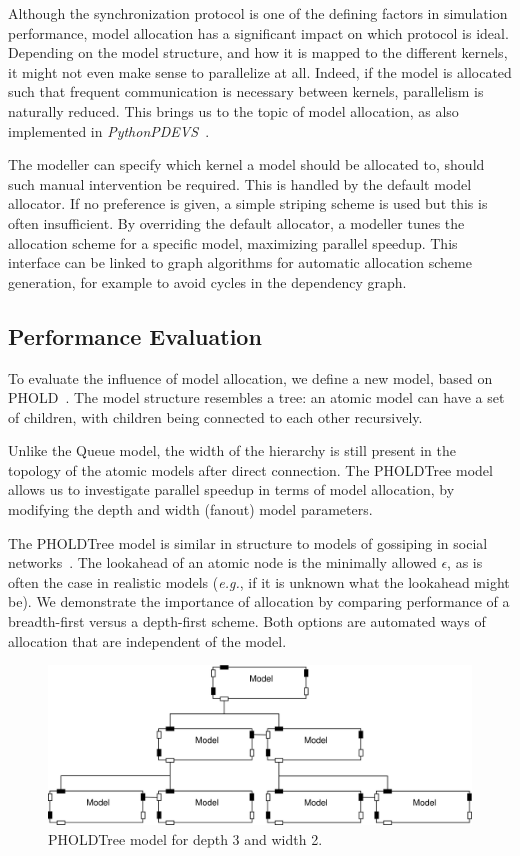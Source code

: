 Although the synchronization protocol is one of the defining factors in simulation performance, model allocation has a significant impact on which protocol is ideal.
Depending on the model structure, and how it is mapped to the different kernels, it might not even make sense to parallelize at all.
Indeed, if the model is allocated such that frequent communication is necessary between kernels, parallelism is naturally reduced.
This brings us to the topic of model allocation, as also implemented in \textit{PythonPDEVS}~\cite{PythonPDEVS2}.

The modeller can specify which kernel a model should be allocated to, should such manual intervention be required.
This is handled by the default model allocator.
If no preference is given, a simple striping scheme is used but this is often insufficient.
By overriding the default allocator, a modeller tunes the allocation scheme for a specific model, maximizing parallel speedup.
This interface can be linked to graph algorithms for automatic allocation scheme generation, for example to avoid cycles in the dependency graph.

\subsection{Performance Evaluation}
To evaluate the influence of model allocation, we define a new model, based on PHOLD~\cite{PHOLD}.
The model structure resembles a tree: an atomic model can have a set of children, with children being connected to each other recursively.

Unlike the Queue model, the width of the hierarchy is still present in the topology of the atomic models after direct connection.
The PHOLDTree model allows us to investigate parallel speedup in terms of model allocation, by modifying the depth and width (fanout) model parameters.

The PHOLDTree model is similar in structure to models of gossiping in social networks~\cite{Gossip}.
The lookahead of an atomic node is the minimally allowed $\epsilon$, as is often the case in realistic models (\textit{e.g.}, if it is unknown what the lookahead might be).
We demonstrate the importance of allocation by comparing performance of a breadth-first versus a depth-first scheme.
Both options are automated ways of allocation that are independent of the model.

\begin{figure}
    \center
    \includegraphics[width=\columnwidth]{fig/pholdtree.pdf}
    \caption{PHOLDTree model for depth 3 and width 2.}
    \label{fig:PHOLDTree_model}
\end{figure}

